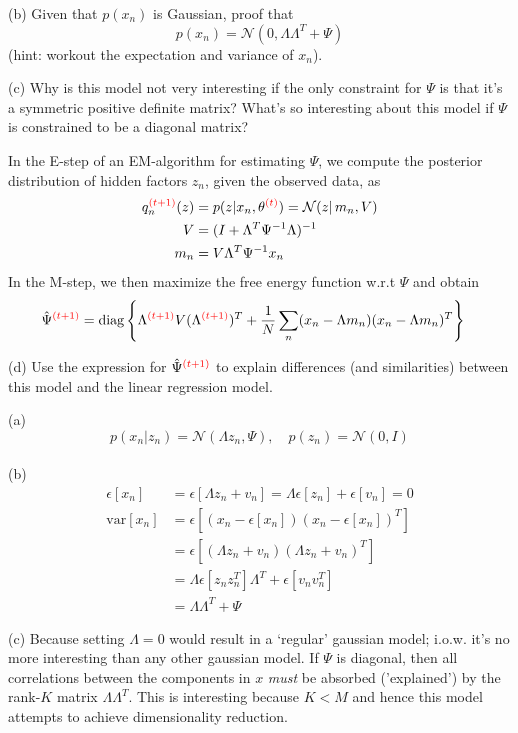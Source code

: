 \documentclass[a4paper]{article}
\newcommand{\N}{\mathcal{N}}
\newcommand{\mc}[1]{\mathcal{#1}}
\newcommand{\var}{\mathrm{var}}
\def\r#1{{\color{red}#1}}
\begin{document}
\begin{ExerciseList}
(b) Given that $p(x_n)$ is Gaussian, proof that
$$p(x_n) = \mc{N}(0,\Lambda \Lambda^T +\Psi)$$
(hint: workout the expectation and variance of $x_n$).

(c) Why is this model not very interesting if the only constraint for $\Psi$ is that it's a symmetric positive definite matrix? What's so interesting about this model if $\Psi$ is constrained to be a diagonal matrix?

\medskip
In the E-step of an EM-algorithm for estimating $\Psi$, we compute the posterior distribution of hidden factors $z_n$, given the observed data, as
\begin{align*}
q_n^{\r{(t+1)}}(z) &= p(z|x_n,\theta^{\r{(t)}}) = \N(z|\,m_n,V)\\
    V &= (I + \Lambda^T \Psi^{-1} \Lambda)^{-1} \\
    m_n &= V \Lambda^T \Psi^{-1} x_n
    \end{align*}
In the M-step, we then maximize the free energy function w.r.t $\Psi$ and obtain
\begin{align*}
\hat \Psi^{\r{(t+1)}} &= \text{diag}\left\{\Lambda^{\r{(t+1)}} V (\Lambda^{\r{(t+1)}})^T + \frac{1}{N} \sum_n (x_n-\Lambda m_n)(x_n-\Lambda m_n)^T \right\}
\end{align*}

(d) Use the expression for $\hat \Psi^{\r{(t+1)}}$ to explain differences (and similarities) between this model and the linear regression model.



\Answer[ref={ex:6}]

(a) $$ p(x_n|z_n) = \mc{N}(\Lambda z_n,\Psi), \quad p(z_n)=\mc{N}(0,I)$$\\

(b) \begin{align*}
\epsilon[x_n] &= \epsilon[\Lambda z_n + v_n] = \Lambda \epsilon[z_n] + \epsilon[v_n] = 0\\
\var[x_n] &= \epsilon[(x_n-\epsilon[x_n])(x_n-\epsilon[x_n])^T]\\
    &=\epsilon[(\Lambda z_n + v_n)(\Lambda z_n + v_n)^T]\\
    &= \Lambda \epsilon[z_nz_n^T]\Lambda^T + \epsilon[v_nv_n^T]\\
    &=\Lambda\Lambda^T + \Psi
\end{align*}

(c) Because setting $\Lambda=0$ would result in a `regular' gaussian model; i.o.w. it's no more interesting than any other gaussian model. If $\Psi$ is diagonal, then all correlations between the components in $x$ \emph{must} be absorbed ('explained') by the rank-$K$ matrix $\Lambda \Lambda^T$. This is interesting because $K<M$ and hence this model attempts to achieve dimensionality reduction.\\


\end{ExerciseList}
\end{document}
